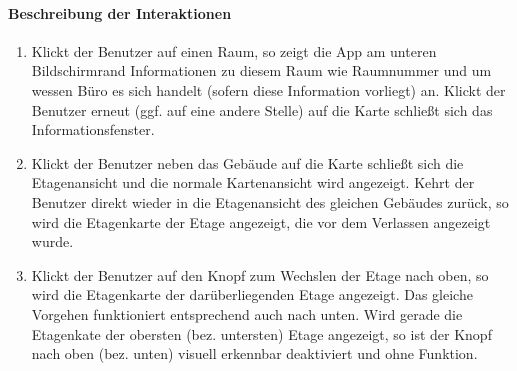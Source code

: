 \paragraph{Beschreibung der Interaktionen}
\begin{enumerate}
    \item Klickt der Benutzer auf einen Raum, so zeigt die App am unteren Bildschirmrand Informationen zu diesem Raum wie Raumnummer und um wessen Büro es sich handelt (sofern diese Information vorliegt) an. Klickt der Benutzer erneut (ggf. auf eine andere Stelle) auf die Karte schließt sich das Informationsfenster.
    \item Klickt der Benutzer neben das Gebäude auf die Karte schließt sich die Etagenansicht und die normale Kartenansicht wird angezeigt. Kehrt der Benutzer direkt wieder in die Etagenansicht des gleichen Gebäudes zurück, so wird die Etagenkarte der Etage angezeigt, die vor dem Verlassen angezeigt wurde.
    \item Klickt der Benutzer auf den Knopf zum Wechslen der Etage nach oben, so wird die Etagenkarte der darüberliegenden Etage angezeigt. Das gleiche Vorgehen funktioniert entsprechend auch nach unten. Wird gerade die Etagenkate der obersten (bez. untersten) Etage angezeigt, so ist der Knopf nach oben (bez. unten) visuell erkennbar deaktiviert und ohne Funktion.
\end{enumerate}